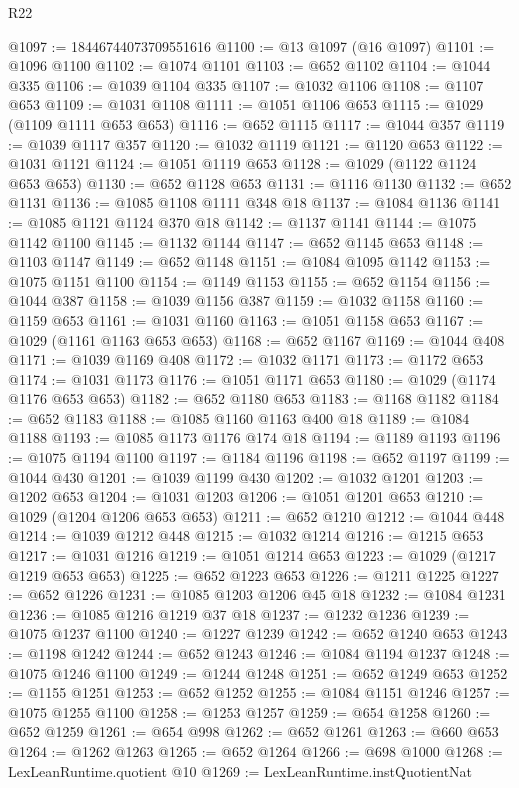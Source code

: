 \begin{lexlean}{R22}
\begin{coremodule}
@1097 := 18446744073709551616
@1100 := @13 @1097 (@16 @1097)
@1101 := @1096 @1100
@1102 := @1074 @1101
@1103 := @652 @1102
@1104 := @1044 @335
@1106 := @1039 @1104 @335
@1107 := @1032 @1106
@1108 := @1107 @653
@1109 := @1031 @1108
@1111 := @1051 @1106 @653
@1115 := @1029 (@1109 @1111 @653 @653)
@1116 := @652 @1115
@1117 := @1044 @357
@1119 := @1039 @1117 @357
@1120 := @1032 @1119
@1121 := @1120 @653
@1122 := @1031 @1121
@1124 := @1051 @1119 @653
@1128 := @1029 (@1122 @1124 @653 @653)
@1130 := @652 @1128 @653
@1131 := @1116 @1130
@1132 := @652 @1131
@1136 := @1085 @1108 @1111 @348 @18
@1137 := @1084 @1136
@1141 := @1085 @1121 @1124 @370 @18
@1142 := @1137 @1141
@1144 := @1075 @1142 @1100
@1145 := @1132 @1144
@1147 := @652 @1145 @653
@1148 := @1103 @1147
@1149 := @652 @1148
@1151 := @1084 @1095 @1142
@1153 := @1075 @1151 @1100
@1154 := @1149 @1153
@1155 := @652 @1154
@1156 := @1044 @387
@1158 := @1039 @1156 @387
@1159 := @1032 @1158
@1160 := @1159 @653
@1161 := @1031 @1160
@1163 := @1051 @1158 @653
@1167 := @1029 (@1161 @1163 @653 @653)
@1168 := @652 @1167
@1169 := @1044 @408
@1171 := @1039 @1169 @408
@1172 := @1032 @1171
@1173 := @1172 @653
@1174 := @1031 @1173
@1176 := @1051 @1171 @653
@1180 := @1029 (@1174 @1176 @653 @653)
@1182 := @652 @1180 @653
@1183 := @1168 @1182
@1184 := @652 @1183
@1188 := @1085 @1160 @1163 @400 @18
@1189 := @1084 @1188
@1193 := @1085 @1173 @1176 @174 @18
@1194 := @1189 @1193
@1196 := @1075 @1194 @1100
@1197 := @1184 @1196
@1198 := @652 @1197
@1199 := @1044 @430
@1201 := @1039 @1199 @430
@1202 := @1032 @1201
@1203 := @1202 @653
@1204 := @1031 @1203
@1206 := @1051 @1201 @653
@1210 := @1029 (@1204 @1206 @653 @653)
@1211 := @652 @1210
@1212 := @1044 @448
@1214 := @1039 @1212 @448
@1215 := @1032 @1214
@1216 := @1215 @653
@1217 := @1031 @1216
@1219 := @1051 @1214 @653
@1223 := @1029 (@1217 @1219 @653 @653)
@1225 := @652 @1223 @653
@1226 := @1211 @1225
@1227 := @652 @1226
@1231 := @1085 @1203 @1206 @45 @18
@1232 := @1084 @1231
@1236 := @1085 @1216 @1219 @37 @18
@1237 := @1232 @1236
@1239 := @1075 @1237 @1100
@1240 := @1227 @1239
@1242 := @652 @1240 @653
@1243 := @1198 @1242
@1244 := @652 @1243
@1246 := @1084 @1194 @1237
@1248 := @1075 @1246 @1100
@1249 := @1244 @1248
@1251 := @652 @1249 @653
@1252 := @1155 @1251
@1253 := @652 @1252
@1255 := @1084 @1151 @1246
@1257 := @1075 @1255 @1100
@1258 := @1253 @1257
@1259 := @654 @1258
@1260 := @652 @1259
@1261 := @654 @998
@1262 := @652 @1261
@1263 := @660 @653
@1264 := @1262 @1263
@1265 := @652 @1264
@1266 := @698 @1000
@1268 := LexLeanRuntime.quotient @10
@1269 := LexLeanRuntime.instQuotientNat

\end{coremodule}
\end{lexlean}
